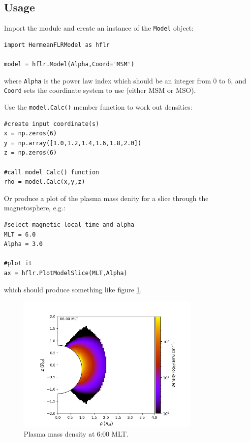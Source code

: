		\subsection{Usage}

			Import the module and create an instance of the \texttt{Model} object:
			\begin{verbatim}
import HermeanFLRModel as hflr

model = hflr.Model(Alpha,Coord='MSM')
			\end{verbatim}
			where \texttt{Alpha} is the power law index which should be an integer from 0 to 6, and \texttt{Coord} sets the coordinate system to use (either MSM or MSO).

			Use the \texttt{model.Calc()} member function to work out densities:
			\begin{verbatim}
#create input coordinate(s)
x = np.zeros(6)
y = np.array([1.0,1.2,1.4,1.6,1.8,2.0])
z = np.zeros(6)

#call model Calc() function
rho = model.Calc(x,y,z)
			\end{verbatim}

			Or produce a plot of the plasma mass denity for a slice through the magnetosphere, e.g.:
			\begin{verbatim}
#select magnetic local time and alpha
MLT = 6.0
Alpha = 3.0

#plot it
ax = hflr.PlotModelSlice(MLT,Alpha)
			\end{verbatim}
			which should produce something like figure \ref{FigHFLR}.

			\begin{figure}
				\begin{center}
					\includegraphics[width=0.8\textwidth]{figures/ch2_hflr.png}
				\end{center}
				\caption{Plasma mass density at 6:00 MLT. \label{FigHFLR}}
			\end{figure}



